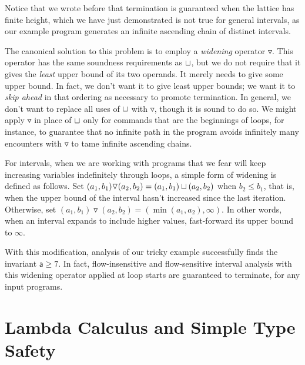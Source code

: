 \documentclass{amsbook}
\theoremstyle{definition}
\theoremstyle{remark}
\numberwithin{section}{chapter}
\numberwithin{equation}{chapter}
\begin{document}
Notice that we wrote before that termination is guaranteed when the lattice has finite height, which we have just demonstrated is not true for general intervals, as our example program generates an infinite ascending chain of distinct intervals.

\newcommand{\widen}[0]{\triangledown}

The canonical solution to this problem is to employ a \emph{widening} operator $\widen$.
This operator has the same soundness requirements as $\sqcup$, but we do not require that it gives the \emph{least} upper bound of its two operands.
It merely needs to give some upper bound.
In fact, we don't want it to give least upper bounds; we want it to \emph{skip ahead} in that ordering as necessary to promote termination.
In general, we don't want to replace all uses of $\sqcup$ with $\widen$, though it is sound to do so.
We might apply $\widen$ in place of $\sqcup$ only for commands that are the beginnings of loops, for instance, to guarantee that no infinite path in the program avoids infinitely many encounters with $\widen$ to tame infinite ascending chains.

For intervals, when we are working with programs that we fear will keep increasing variables indefinitely through loops, a simple form of widening is defined as follows.
Set $(a_1, b_1) \widen (a_2, b_2) = (a_1, b_1) \join (a_2, b_2)$ when $b_2 \leq b_1$, that is, when the upper bound of the interval hasn't increased since the last iteration.
Otherwise, set $(a_1, b_1) \widen (a_2, b_2) = (\min(a_1, a_2), \infty)$.
In other words, when an interval expands to include higher values, fast-forward its upper bound to $\infty$.

With this modification, analysis of our tricky example successfully finds the invariant $\mathsf{a} \geq 7$.
In fact, flow-insensitive and flow-sensitive interval analysis with this widening operator applied at loop starts are guaranteed to terminate, for any input programs.



\chapter{Lambda Calculus and Simple Type Safety}
\end{document}
